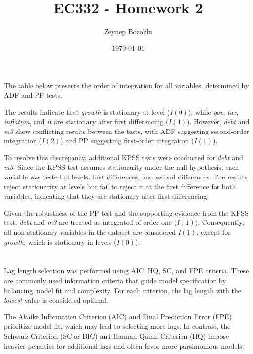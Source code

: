 \documentclass[a4paper,12pt]{article}
\title{EC332 - Homework 2}
\author{Zeynep Bozoklu}
\date{\today}
\begin{document}
\maketitle

\section{}
The table below presents the order of integration for all variables, determined by ADF and PP tests.



The results indicate that \textit{growth} is stationary at level (\(I(0)\)), while \textit{gov}, \textit{tax}, \textit{inflation}, and \textit{it} are stationary after first differencing (\(I(1)\)). However, \textit{debt} and \textit{m3} show conflicting results between the tests, with ADF suggesting second-order integration (\(I(2)\)) and PP suggesting first-order integration (\(I(1)\)). 

To resolve this discrepancy, additional KPSS tests were conducted for \textit{debt} and \textit{m3}. Since the KPSS test assumes stationarity under the null hypothesis, each variable was tested at levels, first differences, and second differences. The results reject stationarity at levels but fail to reject it at the first difference for both variables, indicating that they are stationary after first differencing.



Given the robustness of the PP test and the supporting evidence from the KPSS test, \textit{debt} and \textit{m3} are treated as integrated of order one (\(I(1)\)). Consequently, all non-stationary variables in the dataset are considered \(I(1)\), except for \textit{growth}, which is stationary in levels (\(I(0)\)).


\section{}


Lag length selection was performed using AIC, HQ, SC, and FPE criteria. These are commonly used information criteria that guide model specification by balancing model fit and complexity. For each criterion, the lag length with the \textit{lowest} value is considered optimal. 

The Akaike Information Criterion (AIC) and Final Prediction Error (FPE) prioritize model fit, which may lead to selecting more lags. In contrast, the Schwarz Criterion (SC or BIC) and Hannan-Quinn Criterion (HQ) impose heavier penalties for additional lags and often favor more parsimonious models. 
\end{document}
